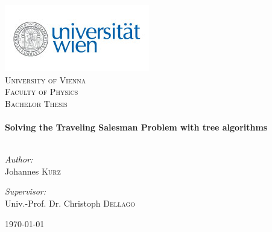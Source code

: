 \begin{titlepage}
\begin{center}

\includegraphics[scale=0.75]{./unilogo}~\\[2cm]

\textsc{\LARGE University of Vienna }\\[0.5cm]
\textsc{\LARGE Faculty of Physics}\\[1.5cm]
\textsc{\Large Bachelor Thesis}\\[0.5cm]

\HRule \\[0.4cm]
{ \huge \bfseries Solving the Traveling Salesman Problem with tree algorithms}\\[0.4cm]

\HRule \\[1.5cm]

\begin{minipage}{0.4\textwidth}
\begin{flushleft} \large
\emph{Author:}\\
Johannes \textsc{Kurz}
\end{flushleft}
\end{minipage}
\begin{minipage}{0.4\textwidth}
\begin{flushright} \large
\emph{Supervisor:} \\
Univ.-Prof. Dr. Christoph \textsc{Dellago}
\end{flushright}
\end{minipage}

\vfill

{\large \today}

\end{center}
\end{titlepage}
